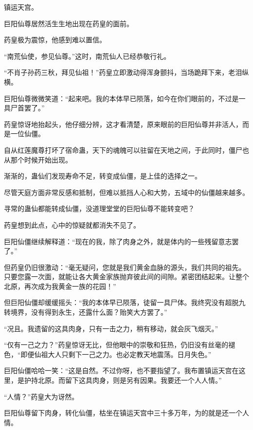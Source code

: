 
\begin{this_body}



镇运天宫。

巨阳仙尊居然活生生地出现在药皇的面前。

药皇极为震惊，他感到难以置信。

“南荒仙使，参见仙尊。”这时，南荒仙人已经恭敬行礼。

“不肖子孙药三秋，拜见仙祖！”药皇立即激动得浑身颤抖，当场跪拜下来，老泪纵横。

巨阳仙尊微微笑道：“起来吧。我的本体早已陨落，如今在你们眼前的，不过是一具尸首罢了。”

药皇惊讶地抬起头，他仔细分辨，这才看清楚，原来眼前的巨阳仙尊并非活人，而是一位仙僵。

自从红莲魔尊打坏了宿命蛊，天下的魂魄可以驻留在天地之间，于此同时，僵尸也从那个时候开始出现。

渐渐的，蛊仙们发现寿命不足，转变成仙僵，是上佳的选择之一。

尽管天庭方面非常反感和抵制，但难以抵挡人心和大势，五域中的仙僵越来越多。

寻常的蛊仙都能转成仙僵，没道理堂堂的巨阳仙尊不能转变吧？

药皇想到此点，心中的惊疑就都消失不见了。

巨阳仙僵继续解释道：“现在的我，除了肉身之外，就是体内的一些残留意志罢了。”

但药皇仍旧很激动：“毫无疑问，您就是我们黄金血脉的源头，我们共同的祖先。只要您露一次面，就能让各大黄金家族抛弃彼此间的间隙。紧密团结起来。让整个北原，再次成为我黄金一族的花园！”

但巨阳仙僵却缓缓摇头：“我的本体早已陨落，徒留一具尸体。我终究没有超脱九转境界，没有得到永生，还露什么面？贻笑大方罢了。”

“况且。我遗留的这具肉身，只有一击之力，稍有移动，就会灰飞烟灭。”

“仅有一己之力？”药皇惊讶无比，但他眼中的崇敬和狂热，仍旧没有丝毫的褪色，“即便仙祖大人只剩下一己之力。也必定教天地震荡。日月失色。”

巨阳仙僵哈哈一笑：“这是自然。不过你呀，也不要指望了。我布置镇运天宫在这里，是护持北原。而留下这具肉身，则是另有因果。我要还一个人人情。”

“人情？”药皇大为讶然。

巨阳仙尊留下肉身，转化仙僵，枯坐在镇运天宫中三十多万年，为的就是还一个人情。


\end{this_body}
